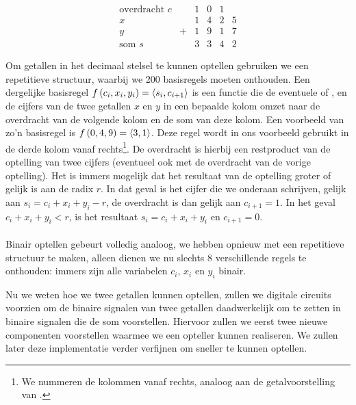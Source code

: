 \begin{equation}
\begin{array}{r|lcccc}
\mbox{overdracht $c$}&&1&0&1&\\
x&&1&4&2&5\\
y&+&1&9&1&7\\\hline
\mbox{som $s$}&&3&3&4&2
\end{array}
\end{equation}

Om getallen in het decimaal stelsel te kunnen optellen gebruiken we een repetitieve structuur, waarbij we 200 basisregels moeten onthouden. Een dergelijke basisregel $f\left( c_i,x_i,y_i \right)=\left\langle s_i,c_{i+1} \right\rangle$ is een functie die de eventuele  of , en de cijfers van de twee getallen $x$ en $y$ in een bepaalde kolom omzet naar de overdracht van de volgende kolom en de som van deze kolom. Een voorbeeld van zo'n basisregel is $f\left( 0,4,9 \right)=\left\langle 3,1 \right\rangle$. Deze regel wordt in ons voorbeeld gebruikt in de derde kolom vanaf rechts\footnote{We nummeren de kolommen vanaf rechts, analoog aan de getalvoorstelling van .}. De overdracht is hierbij een restproduct van de optelling van twee cijfers (eventueel ook met de overdracht van de vorige optelling). Het is immers mogelijk dat het resultaat van de optelling groter of gelijk is aan de radix $r$. In dat geval is het cijfer die we onderaan schrijven, gelijk aan $s_i=c_i+x_i+y_i-r$, de overdracht is dan gelijk aan $c_{i+1}=1$. In het geval $c_i+x_i+y_i<r$, is het resultaat $s_i=c_i+x_i+y_i$ en $c_{i+1}=0$.

\paragraph{}
Binair optellen gebeurt volledig analoog, we hebben opnieuw met een repetitieve structuur te maken, alleen dienen we nu slechts 8 verschillende regels te onthouden: immers zijn alle variabelen $c_i$, $x_i$ en $y_i$ binair.

Nu we weten hoe we twee getallen kunnen optellen, zullen we digitale circuits voorzien om de binaire signalen van twee getallen
daadwerkelijk om te zetten in binaire signalen die de som voorstellen. Hiervoor zullen we eerst twee nieuwe componenten voorstellen waarmee we een opteller kunnen realiseren. We zullen later deze implementatie verder verfijnen om sneller te kunnen optellen.

